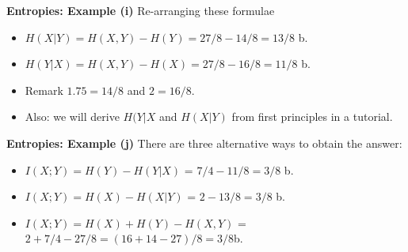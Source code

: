 
\medskip
\noindent \textbf{Entropies: Example (i)}
Re-arranging these formulae
\begin{itemize}
\item $H(X|Y) = H(X,Y)-H(Y) = 27/8 - 14/8 = 13/8$ b. \bigskip
\item $H(Y|X) = H(X,Y)-H(X) = 27/8 - 16/8 = 11/8$ b.
\end{itemize}
\bigskip
\begin{itemize}
\item Remark $1.75 =14/8$ and $2 = 16/8$.\\\bigskip
\item Also: we will derive $H(Y|X$ and $H(X|Y)$ from first principles in a tutorial.
\end{itemize}


\medskip
\noindent \textbf{Entropies: Example (j)}
There are three alternative ways to obtain the answer:
\begin{itemize}
\item $I(X; Y ) = H(Y ) - H(Y |X)$ = $7/4 - 11/8 = 3/8$ b.
\item $I(X; Y ) = H(X) - H(X|Y)$ = $2 - 13/8 = 3/8$ b.
\item $I(X; Y ) = H(X) + H(Y ) - H(X,Y )$ = $2 + 7/4 - 27/8 = (16+14-27)/8 = 3/8$b.
\end{itemize}

